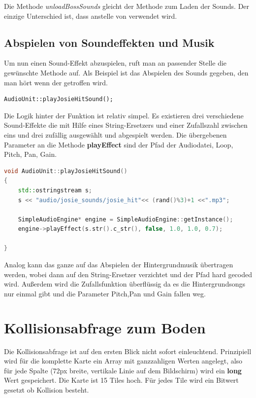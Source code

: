 Die Methode \textit{unloadBossSounds} gleicht der Methode zum Laden der Sounds. Der einzige Unterschied ist, dass  anstelle von  verwendet wird.

\subsection{Abspielen von Soundeffekten und Musik} 
Um nun einen Sound-Effekt abzuspielen, ruft man an passender Stelle die gewünschte Methode auf. Als Beispiel ist das Abspielen des Sounds gegeben, den man hört wenn der  getroffen wird.

\begin{lstlisting}[style=singleline]
AudioUnit::playJosieHitSound();
\end{lstlisting}

Die Logik hinter der Funktion ist relativ simpel. Es existieren drei verschiedene Sound-Effekte die mit Hilfe eines String-Ersetzers und einer Zufallszahl zwischen eins und drei zufällig ausgewählt und abgespielt werden. Die übergebenen Parameter an die Methode \textbf{playEffect} sind der Pfad der Audiodatei, Loop, Pitch, Pan, Gain.

\begin{lstlisting}[label=lst:playJosieShootSound,
				   language=C++,
				   firstnumber=30,
				   caption=BossLevel Shoot Sound abspielen ( AudioUnit.cpp )]
void AudioUnit::playJosieHitSound()
{
	std::ostringstream s;
	s << "audio/josie_sounds/josie_hit"<< (rand()%3)+1 <<".mp3";

	SimpleAudioEngine* engine = SimpleAudioEngine::getInstance();
	engine->playEffect(s.str().c_str(), false, 1.0, 1.0, 0.7);
	
}
\end{lstlisting}

Analog kann das ganze auf das Abspielen der Hintergrundmusik übertragen werden, wobei dann auf den String-Ersetzer verzichtet und der Pfad hard gecoded wird. Außerdem wird die Zufallsfunktion überflüssig da es die Hintergrundsongs nur einmal gibt und die Parameter Pitch,Pan und Gain fallen weg.



\section{Kollisionsabfrage zum Boden}\label{sec:4_Kollisionsabfrage}

Die Kollisionsabfrage ist auf den ersten Blick nicht sofort einleuchtend. Prinzipiell wird für die komplette Karte ein Array mit ganzzahligen Werten angelegt, also für jede Spalte (72px breite, vertikale Linie auf dem Bildschirm) wird ein \textbf{long} Wert gespeichert.
Die Karte ist 15 Tiles hoch. Für jedes Tile wird ein Bitwert gesetzt ob Kollision besteht.

